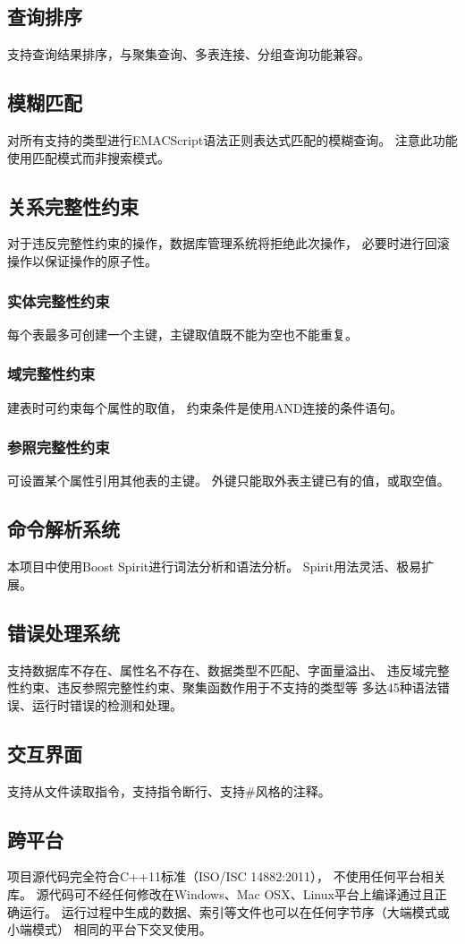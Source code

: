     \subsection{查询排序}
        支持查询结果排序，与聚集查询、多表连接、分组查询功能兼容。
    \subsection{模糊匹配}
        对所有支持的类型进行EMACScript语法正则表达式匹配的模糊查询。%
        注意此功能使用匹配模式而非搜索模式。
    \subsection{关系完整性约束}
        对于违反完整性约束的操作，数据库管理系统将拒绝此次操作，%
        必要时进行回滚操作以保证操作的原子性。
        \subsubsection{实体完整性约束}
            每个表最多可创建一个主键，主键取值既不能为空也不能重复。
        \subsubsection{域完整性约束}
            建表时可约束每个属性的取值，%
            约束条件是使用AND连接的条件语句。%
        \subsubsection{参照完整性约束}
            可设置某个属性引用其他表的主键。%
            外键只能取外表主键已有的值，或取空值。
    \subsection{命令解析系统}
        本项目中使用Boost Spirit进行词法分析和语法分析。%
        Spirit用法灵活、极易扩展。
    \subsection{错误处理系统}
        支持数据库不存在、属性名不存在、数据类型不匹配、字面量溢出、%
        违反域完整性约束、违反参照完整性约束、聚集函数作用于不支持的类型等%
        多达45种语法错误、运行时错误的检测和处理。
    \subsection{交互界面}
        支持从文件读取指令，支持指令断行、支持\#风格的注释。
    \subsection{跨平台}
        项目源代码完全符合C++11标准（ISO/ISC 14882:2011），%
        不使用任何平台相关库。%
        源代码可不经任何修改在Windows、Mac OSX、Linux平台上编译通过且正确运行。%
        运行过程中生成的数据、索引等文件也可以在任何字节序（大端模式或小端模式）%
        相同的平台下交叉使用。



